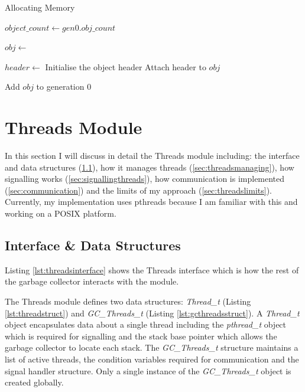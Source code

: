\documentclass[../diss.tex]{subfiles}
\begin{document}
\begin{algorithm}
\caption{Allocating Memory}
\label{alg:gcmalloc}
\begin{algorithmic}


\State {}

\State $object\_count\gets gen0.obj\_count$
\State {}
\EndIf

\State
\State $obj\gets$ 

\State
\State $header\gets$ Initialise the object header
\State Attach header to $obj$

\State
\State {}
\State Add $obj$ to generation 0

\State {}

\EndFunction

\end{algorithmic}
\end{algorithm}


\section{Threads Module} \label{sec:threads}

In this section I will discuss in detail the Threads module including: the interface and data structures (\cref{sec:threadsinterface}), how it manages threads (\cref{sec:threadsmanaging}), how signalling works (\cref{sec:signallingthreads}), how communication is implemented (\cref{sec:communication}) and the limits of my approach (\cref{sec:threadslimits}). Currently, my implementation uses pthreads because I am familiar with this and working on a POSIX platform. 

\subsection{Interface \& Data Structures} \label{sec:threadsinterface}

Listing \ref{lst:threadsinterface} shows the Threads interface which is how the rest of the garbage collector interacts with the module.

The Threads module defines two data structures: \emph{Thread\_t} (Listing \ref{lst:threadstruct}) and \emph{GC\_Threads\_t} (Listing \ref{lst:gcthreadsstruct}). A \emph{Thread\_t} object encapsulates data about a single thread including the \emph{pthread\_t} object which is required for signalling and the stack base pointer which allows the garbage collector to locate each stack. The \emph{GC\_Threads\_t} structure maintains a list of active threads, the condition variables required for communication and the signal handler structure. Only a single instance of the \emph{GC\_Threads\_t} object is created globally.
\end{document}
